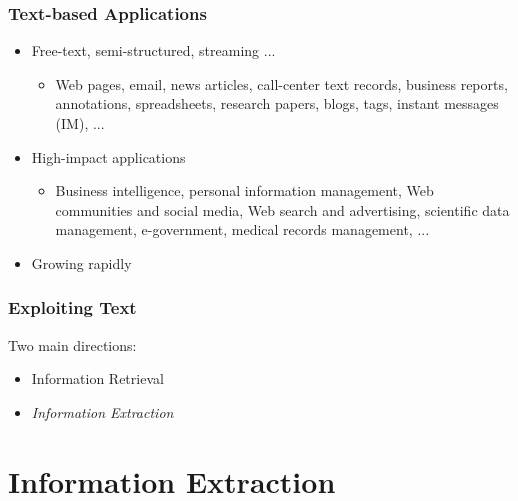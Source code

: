 \documentclass{beamer}
\begin{document}
\begin{frame}
  \frametitle{Text-based Applications}
  \begin{itemize}
  \item Free-text, semi-structured, streaming ...
      \begin{itemize}
      \item Web pages, email, news articles, call-center text records, business
          reports, annotations, spreadsheets, research papers, blogs, tags,
          instant messages (IM), ...
      \end{itemize}
  \item High-impact applications
      \begin{itemize}
      \item Business intelligence, personal information management, Web
          communities and social media, Web search and advertising, scientific data management,
          e-government, medical records management, ...
      \end{itemize}
  \item Growing rapidly
  \end{itemize}
\end{frame}

\begin{frame}
  \frametitle{Exploiting Text}
  Two main directions:
  \begin{itemize}
  \item Information Retrieval
  \item \emph{Information Extraction}
  \end{itemize}
\end{frame}

\section{Information Extraction}

\newcommand{\job}[1]{\textcolor<4->{red}{#1}}
\newcommand{\artist}[1]{\textcolor<2->{green}{#1}}
\newcommand{\band}[1]{\textcolor<3->{blue}{#1}}
\end{document}
